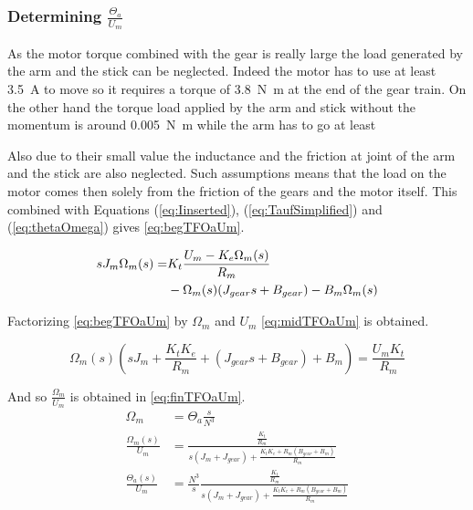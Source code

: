 \subsubsection{Determining $\frac{\Theta_a}{U_m}$}


As the motor torque combined with the gear is really large the load generated by the arm and the stick can be neglected. Indeed the motor has to use at least \SI{3.5}{\ampere} to move so it requires a torque of \SI{3.8}{\newton\meter} at the end of the gear train. On the other hand the torque load applied by the arm and stick without the momentum is around \SI{0.005}{\newton\meter} while the arm has to go at least 

Also due to their small value the inductance and the friction at joint of the arm and the stick are also neglected. Such assumptions means that the load on the motor comes then solely from the friction of the gears and the motor itself. This combined with Equations (\ref{eq:Iinserted}), (\ref{eq:TaufSimplified}) and (\ref{eq:thetaOmega}) gives \autoref{eq:begTFOaUm}.


\begin{align}\label{eq:begTFOaUm}
	s J_{m} \Omega_m(s) = &K_{t} \frac{U_m-K_e \Omega_m(s)}{R_m} \notag \\ 
	&- \Omega_m(s) (J_{gear}s+B_{gear}) - B_{m} \Omega_m(s) \addunit{1}
\end{align}

Factorizing \autoref{eq:begTFOaUm} by $\Omega_m$ and $U_m$ \autoref{eq:midTFOaUm} is obtained.

\begin{equation}\label{eq:midTFOaUm}
	\Omega_m(s)\left(s J_m+\frac{K_t K_e}{ R_m} + (J_{gear}s+B_{gear}) + B_{m}  \right)=\frac{U_m K_t}{R_m}	
\end{equation}

And so $\frac{\Omega_m}{U_m}$ is obtained in \autoref{eq:finTFOaUm}.
\begin{subequations}\label{eq:finTFOaUm}
	\begin{align}
		\Omega_m&=\Theta_a\frac{s}{N^3}\\
		\frac{\Omega_m(s)}{U_m}&=\frac{\frac{ K_t}{R_m}}{s(J_m+J_{gear})+\frac{K_t K_e +R_m (B_{gear}+B_m)}{R_m}} \\
		\frac{\Theta_a(s)}{U_m}&=\frac{N^3}{s}\frac{\frac{ K_t}{R_m}}{s(J_m+J_{gear})+\frac{K_t K_e +R_m (B_{gear}+B_m)}{R_m}}
	\end{align}
\end{subequations}